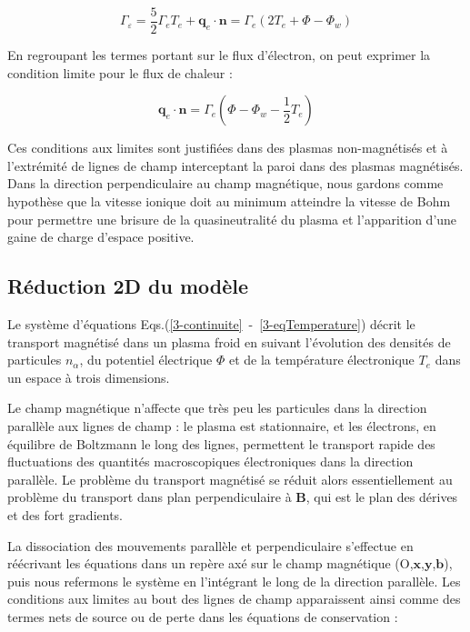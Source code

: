 \begin{refsection}
\begin{equation}
\Gamma_\varepsilon=\frac{5}{2}{\Gamma}_eT_e+\mathbf{q}_e\cdot\mathbf{n}=
\Gamma_e\left(2T_e+\Phi-\Phi_w\right)
\end{equation}

En regroupant les termes portant sur le flux d'électron, on peut exprimer la
condition limite pour le flux de chaleur :

\begin{equation}
\mathbf{q}_e\cdot\mathbf{n}=\Gamma_e\left(\Phi-\Phi_w-\frac{1}{2}T_e\right)
\end{equation}

Ces conditions aux limites sont justifiées dans des plasmas non-magnétisés et à
l'extrémité de lignes de champ interceptant la paroi dans
des plasmas magnétisés. Dans la direction perpendiculaire au champ magnétique,
nous gardons comme hypothèse que la vitesse ionique doit au
minimum atteindre la vitesse de Bohm pour permettre une brisure de
la quasineutralité du plasma et l'apparition d'une gaine de charge d'espace
positive.

\subsection{Réduction 2D du modèle}

Le système d'équations Eqs.(\ref{3-continuite}~-~\ref{3-eqTemperature}) décrit le
transport magnétisé dans un plasma froid en suivant l'évolution des densités de
particules $n_\alpha$, du potentiel électrique $\Phi$ et de la température
électronique $T_e$ dans un espace à trois dimensions. 

Le champ magnétique n'affecte que très peu les particules dans la direction
parallèle aux lignes de champ : le plasma est stationnaire, et les électrons, en
équilibre de Boltzmann le long des lignes, permettent le transport rapide des fluctuations des quantités
macroscopiques électroniques dans la direction parallèle. Le problème du
transport magnétisé se réduit alors essentiellement au problème du transport
dans plan perpendiculaire à $\mathbf B$, qui est le plan des dérives et des
fort gradients.

La dissociation des mouvements parallèle et perpendiculaire s'effectue
en réécrivant les équations dans un repère axé sur le champ magnétique
(O,$\mathbf x$,$\mathbf y$,$\mathbf b$), puis nous refermons le
système en l'intégrant le long de la direction parallèle. Les conditions aux
limites au bout des lignes de champ apparaissent ainsi comme des termes
nets de source ou de perte dans les équations de conservation :


\end{refsection}

